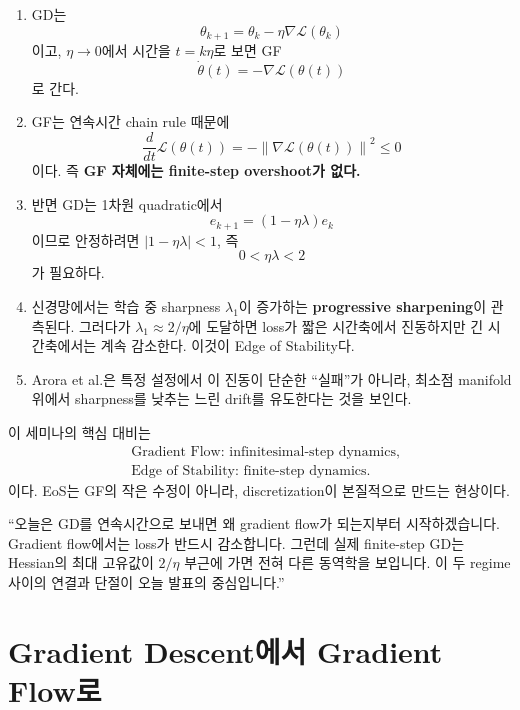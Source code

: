 \documentclass[11pt,a4paper,oneside,openany]{memoir}
\newcommand{\Loss}{\mathcal{L}}
\newcommand{\grad}{\nabla}
\newcommand{\norm}[1]{\left\lVert #1\right\rVert}
\theoremstyle{definition}
\begin{document}
\begin{enumerate}
  \item GD는
  \[
    \theta_{k+1}=\theta_k-\eta\grad\Loss(\theta_k)
  \]
  이고, $\eta\to0$에서 시간을 $t=k\eta$로 보면 GF
  \[
    \dot\theta(t)=-\grad\Loss(\theta(t))
  \]
  로 간다.

  \item GF는 연속시간 chain rule 때문에
  \[
    \frac{d}{dt}\Loss(\theta(t))=-\norm{\grad\Loss(\theta(t))}^2\le0
  \]
  이다. 즉 \textbf{GF 자체에는 finite-step overshoot가 없다.}

  \item 반면 GD는 1차원 quadratic에서
  \[
    e_{k+1}=(1-\eta\lambda)e_k
  \]
  이므로 안정하려면 $|1-\eta\lambda|<1$, 즉
  \[
    \boxed{0<\eta\lambda<2}
  \]
  가 필요하다.

  \item 신경망에서는 학습 중 sharpness $\lambda_1$이 증가하는 \textbf{progressive sharpening}이 관측된다.
  그러다가 $\lambda_1\approx2/\eta$에 도달하면 loss가 짧은 시간축에서 진동하지만 긴 시간축에서는 계속 감소한다.
  이것이 Edge of Stability다.

  \item Arora et al.은 특정 설정에서 이 진동이 단순한 ``실패''가 아니라,
  최소점 manifold 위에서 sharpness를 낮추는 느린 drift를 유도한다는 것을 보인다.
\end{enumerate}

\begin{keybox}
이 세미나의 핵심 대비는
\[
\begin{aligned}
&\text{Gradient Flow: infinitesimal-step dynamics},\\
&\text{Edge of Stability: finite-step dynamics}.
\end{aligned}
\]
이다. EoS는 GF의 작은 수정이 아니라, discretization이 본질적으로 만드는 현상이다.
\end{keybox}

\begin{presentbox}
``오늘은 GD를 연속시간으로 보내면 왜 gradient flow가 되는지부터 시작하겠습니다.
Gradient flow에서는 loss가 반드시 감소합니다. 그런데 실제 finite-step GD는 Hessian의 최대 고유값이
$2/\eta$ 부근에 가면 전혀 다른 동역학을 보입니다. 이 두 regime 사이의 연결과 단절이 오늘 발표의 중심입니다.''
\end{presentbox}

\chapter{Gradient Descent에서 Gradient Flow로}
\end{document}
